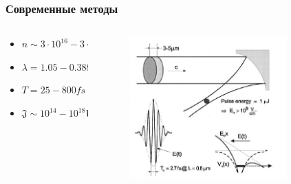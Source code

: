 \documentclass[handout]{beamer}
\begin{document}
\begin{frame}
    \frametitle{Современные методы}

    \begin{columns}
        \begin{column}{0.4\textwidth}
            \begin{itemize}
                \item $n \sim 3\cdot 10^{16} - 3\cdot 10^{18} cm^{-3}$
                \item $\lambda = 1.05 - 0.388 \mu m$
                \item $T = 25 - 800 fs$
                \item $\mathfrak{J} \sim 10^{14} - 10^{18}  W/cm^2$
            \end{itemize}
        \end{column}
        
        \begin{column}{0.7\textwidth}
            \begin{figure}[h]
                \centering
                \includegraphics[width=0.8\textwidth]{new/new_ex.jpg}
            \end{figure}
        \end{column}
      \end{columns}
\end{frame}
\end{document}
